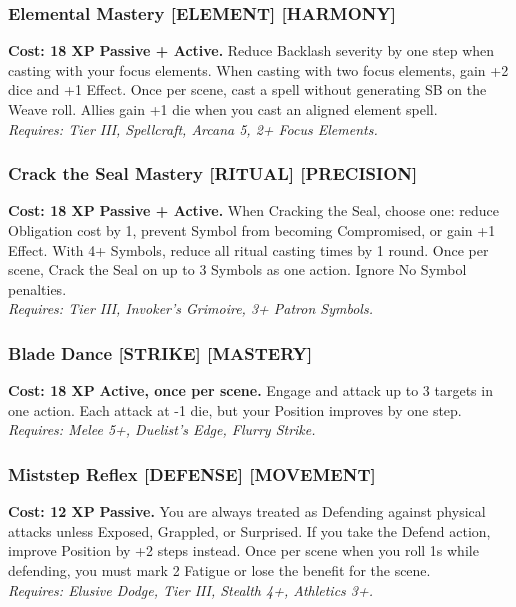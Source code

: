 \documentclass[12pt,a4paper]{book}
\begin{document}
\subsubsection*{Elemental Mastery \textnormal{[ELEMENT] [HARMONY]}}
\label{talent:elemental-mastery}
\textbf{Cost: 18 XP} \textbf{Passive + Active.} Reduce Backlash severity by one step when casting with your focus elements. When casting with two focus elements, gain +2 dice and +1 Effect. Once per scene, cast a spell without generating SB on the Weave roll. Allies gain +1 die when you cast an aligned element spell. \\
\textit{Requires: Tier III, Spellcraft, Arcana 5, 2+ Focus Elements.}

\subsubsection*{Crack the Seal Mastery \textnormal{[RITUAL] [PRECISION]}}
\label{talent:crack-seal-mastery}
\textbf{Cost: 18 XP} \textbf{Passive + Active.} When Cracking the Seal, choose one: reduce Obligation cost by 1, prevent Symbol from becoming Compromised, or gain +1 Effect. With 4+ Symbols, reduce all ritual casting times by 1 round. Once per scene, Crack the Seal on up to 3 Symbols as one action. Ignore No Symbol penalties. \\
\textit{Requires: Tier III, Invoker's Grimoire, 3+ Patron Symbols.}

\subsubsection*{Blade Dance \textnormal{[STRIKE] [MASTERY]}}
\label{talent:blade-dance}
\textbf{Cost: 18 XP} \textbf{Active, once per scene.} Engage and attack up to 3 targets in one action. Each attack at -1 die, but your Position improves by one step. \\
\textit{Requires: Melee 5+, Duelist's Edge, Flurry Strike.}

\subsubsection*{Miststep Reflex \textnormal{[DEFENSE] [MOVEMENT]}}
\label{talent:miststep-reflex}
\textbf{Cost: 12 XP} \textbf{Passive.} You are always treated as Defending against physical attacks unless Exposed, Grappled, or Surprised. If you take the Defend action, improve Position by +2 steps instead. Once per scene when you roll 1s while defending, you must mark 2 Fatigue or lose the benefit for the scene. \\
\textit{Requires: Elusive Dodge, Tier III, Stealth 4+, Athletics 3+.}
\end{document}
